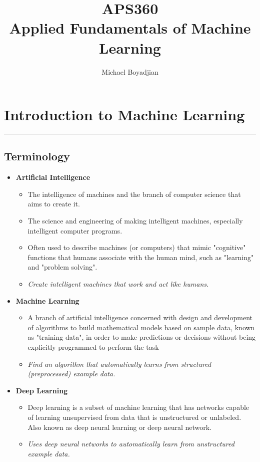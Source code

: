\documentclass[11pt]{article}
\begin{document}
\title{APS360  \\ Applied Fundamentals of Machine Learning}
\author{Michael Boyadjian}
\maketitle
\pagebreak

\tableofcontents

\pagebreak

\bigskip
\bigskip
\bigskip

\section{Introduction to Machine Learning}
 \hrule \vspace{15pt}

\subsection{Terminology}
\begin{itemize}
\item \textbf{Artificial Intelligence}
\begin{itemize}
\item The intelligence of machines and the branch of computer science that aims to create it.
\item The science and engineering of making intelligent machines, especially intelligent computer programs.
\item Often used to describe machines (or computers) that mimic "cognitive" functions that humans associate with the human mind, such as "learning" and "problem solving".
\item \textit{Create intelligent machines that work and act like humans.}
\end{itemize}
\item \textbf{Machine Learning}
\begin{itemize}
\item A branch of artificial intelligence concerned with design and development of algorithms to build mathematical models based on sample data, known as "training data", in order to make predictions or decisions without being explicitly programmed to perform the task
\item \textit{Find an algorithm that automatically learns from structured (preprocessed) example data.}
\end{itemize}
\item \textbf{Deep Learning}
\begin{itemize}
\item Deep learning is a subset of machine learning that has networks capable of learning unsupervised from data that is unstructured or unlabeled. Also known as deep neural learning or deep neural network.
\item \textit{Uses deep neural networks to automatically learn from unstructured example data.}
\end{itemize}
\end{itemize}
\end{document}
